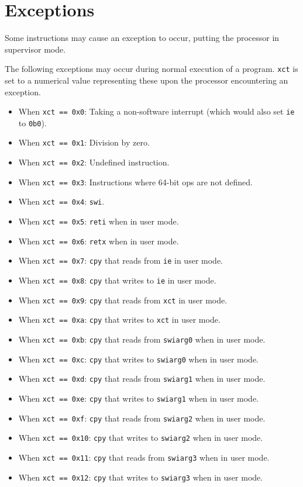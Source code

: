 \documentclass{article}
\begin{document}
\section{Exceptions}
	Some instructions may cause an exception to occur, putting the
	processor in supervisor mode.

	The following exceptions may occur during normal execution of a
	program. \texttt{xct} is set to a numerical value representing these
	upon the processor encountering an exception. 

	\begin{itemize}
	\item When \texttt{xct == 0x0}:
		Taking a non-software interrupt (which would also set \texttt{ie}
		to \texttt{0b0}).
	\item When \texttt{xct == 0x1}: Division by zero.
	\item When \texttt{xct == 0x2}: Undefined instruction.
	\item When \texttt{xct == 0x3}:
		Instructions where 64-bit ops are not defined.
	\item When \texttt{xct == 0x4}: \texttt{swi}.
	\item When \texttt{xct == 0x5}: \texttt{reti} when in user mode.
	\item When \texttt{xct == 0x6}: \texttt{retx} when in user mode.

	\item When \texttt{xct == 0x7}:
		\texttt{cpy} that reads from \texttt{ie} in user mode.
	\item When \texttt{xct == 0x8}:
		\texttt{cpy} that writes to \texttt{ie} in user mode.
	\item When \texttt{xct == 0x9}:
		\texttt{cpy} that reads from \texttt{xct} in user mode.
	\item When \texttt{xct == 0xa}:
		\texttt{cpy} that writes to \texttt{xct} in user mode.

	\item When \texttt{xct == 0xb}:
		\texttt{cpy} that reads from \texttt{swiarg0} when in user mode.
	\item When \texttt{xct == 0xc}:
		\texttt{cpy} that writes to \texttt{swiarg0} when in user mode.
	\item When \texttt{xct == 0xd}:
		\texttt{cpy} that reads from \texttt{swiarg1} when in user mode.
	\item When \texttt{xct == 0xe}:
		\texttt{cpy} that writes to \texttt{swiarg1} when in user mode.

	\item When \texttt{xct == 0xf}:
		\texttt{cpy} that reads from \texttt{swiarg2} when in user mode.
	\item When \texttt{xct == 0x10}:
		\texttt{cpy} that writes to \texttt{swiarg2} when in user mode.
	\item When \texttt{xct == 0x11}:
		\texttt{cpy} that reads from \texttt{swiarg3} when in user mode.
	\item When \texttt{xct == 0x12}:
		\texttt{cpy} that writes to \texttt{swiarg3} when in user mode.


\end{itemize}
\end{document}
